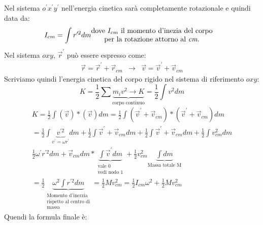 \documentclass{book}
\begin{document}
Nel sistema $o^\prime x^\prime y^\prime$ nell'energia cinetica sarà completamente
rotazionale e quindi data da:
\begin{eqnarray*}
  I_{cm}=\int r^{\prime2} dm & \begin{matrix}
                                 \text{dove $I_{cm}$ il momento d'inezia del corpo}\\
                                 \text{per la rotazione attorno al \it cm.}
                               \end{matrix}
\end{eqnarray*}
Nel sistema $oxy$, $\vec{r}^\prime$ può essere espresso come:
\begin{eqnarray*}
  \vec{r}=\vec{r}^\prime+\vec{r}_{cm} & \to & \vec{v}=\vec{v}^\prime+\vec{v}_{cm}
\end{eqnarray*}
Scriviamo quindi l'energia cinetica del corpo rigido nel sistema di riferimento $oxy$:
\begin{equation}
  K=\frac{1}{2}\displaystyle\sum \underbrace{m_iv^2\to K}_{\text{corpo continuo}}=
  \frac{1}{2}\int v^2 dm
\end{equation}
\clearpage
\begin{eqnarray*}
  K=\frac{1}{2}\int(\vec{v})*(\vec{v})dm=\frac{1}{2}\int(\vec{v}^\prime+\vec{v}_{cm})*
  (\vec{v}^\prime+\vec{v}_{cm})dm\\
  =\frac{1}{2}\int \underbrace{v^{\prime 2}}_{v^\prime=\omega r^\prime}dm+
  \frac{1}{2}\int\vec{v}^\prime+\vec{v}_{cm}dm+\frac{1}{2}
  \int\vec{v}^\prime+\vec{v}_{cm} dm + \frac{1}{2}\int v^2_{cm}dm\\
  \frac{1}{2}\omega^\prime r^{\prime2}dm+\vec{v}_{cm}dm*
  \underbrace{\int\vec{v}^\prime dm}_{\begin{matrix}
                                        \text{vale 0}\\
                                        \text{vedi nodo 1}
                                      \end{matrix}}
  +\frac{1}{2} v_{cm}^2\underbrace{\int dm}_{\text{Massa totale M}}\\
  =\frac{1}{2}\underbrace{\omega^2\int r^{\prime 2}dm}_{
  \begin{matrix} \text{Momento d'inerzia}\\
    \text{rispetto al centro di}\\
    \text{massa}
  \end{matrix}} = \frac{1}{2}Mv_{cm}^2=\frac{1}{2}I_{cm}\omega^2+\frac{1}{2}Mv^2_{cm}
\end{eqnarray*}
Quendi la formula finale è:
\end{document}
